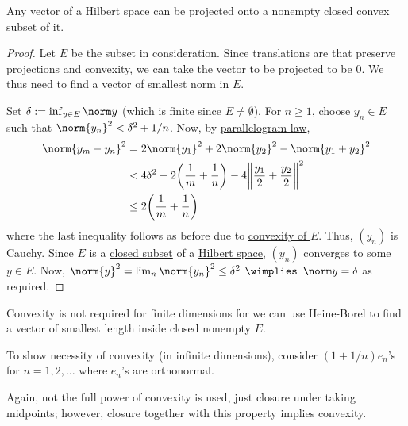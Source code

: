 	\begin{thm}\label{THM: proj's in Hilbert spaces}
		Any vector of a Hilbert space
		can be projected onto a nonempty closed convex subset of it.
	\end{thm}
	
	\begin{proof}
		Let $E$ be the subset in consideration. Since translations are  that preserve projections and convexity, we can \wlogg take the vector to be projected to be $0$. We thus need to find a vector of smallest norm in $E$.
		
		Set $\delta := \inf_{y\in E}\norm y$ (which is finite since \uline{$E\ne\emptyset$}). For $n\ge 1$, choose
		$y_n\in E$ such that $\norm{y_n}^2 < \delta^2 + 1/n$. Now, by \uline{parallelogram law},
		\begin{align*}
			\norm{y_m - y_n}^2 & = 2\norm{y_1}^2 + 2\norm{y_2}^2 - \norm{y_1 + y_2}^2\\
			& < 4\delta^2 + 2\biggl( \frac{1}{m} + \frac{1}{n} \biggr) - 4\biggl\| \frac{y_1}{2} + \frac{y_2}{2} \biggr\|^2\\
			& \le 2\biggl( \frac{1}{m} + \frac{1}{n} \biggr)
		\end{align*}
		where the last inequality follows as before due to \uline{convexity of $E$}. Thus, $(y_n)$ is Cauchy. Since $E$ is a \uline{closed subset} of a \uline{Hilbert space}, $(y_n)$ converges to some $y\in E$. Now, $\norm{y}^2 = \lim_n \norm{y_n}^2\le \delta^2$ $\wimplies$ $\norm y = \delta$ as required.
	\end{proof}
	
	\begin{rmk}
		\begin{rmklist}
			\item Convexity is not required for finite dimensions for we can use Heine-Borel
			to find a vector of smallest length inside closed nonempty $E$.
			
			\item To show necessity of convexity (in infinite dimensions), consider $(1 + 1/n)e_n$'s for $n = 1, 2, \ldots$ where $e_n$'s are orthonormal.
			
			\item Again, not the full power of convexity is used, just closure under taking midpoints; however, closure together with this property implies convexity.
		\end{rmklist}
	\end{rmk}
	
